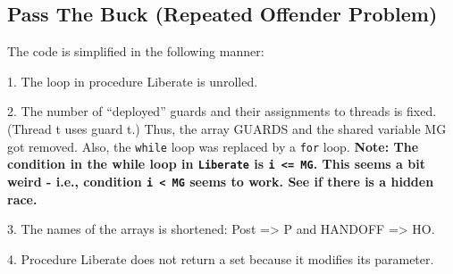 
\subsection{Pass The Buck (Repeated Offender Problem)}\label{sec:proofs-pass}



The code is simplified in the following manner:

1. The loop in procedure Liberate is unrolled.

2. The number of ``deployed'' guards and their assignments to threads is fixed.
(Thread t uses guard t.) Thus, the array GUARDS and the shared variable MG got removed. Also, the \texttt{while} loop was replaced by a \texttt{for} loop.
\textbf{Note: The condition in the while loop in \texttt{Liberate} is \texttt{i <= MG}. This seems a bit weird - i.e., condition \texttt{i < MG} seems to work. See if there is a hidden race.}


3. The names of the arrays is shortened: Post => P and HANDOFF => HO.

4. Procedure Liberate does not return a set because it modifies its parameter.  


